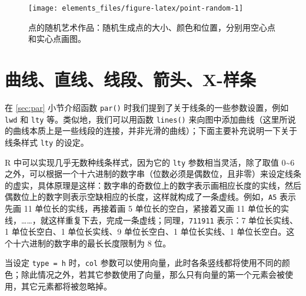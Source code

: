 \documentclass[
  b5paper,
  UTF8,twoside]{book}
\begin{document}
\begin{figure}

{\centering \texttt{[image: elements\_files/figure-latex/point-random-1]} 

}

\caption[点的随机艺术作品]{点的随机艺术作品：随机生成点的大小、颜色和位置，分别用空心点和实心点画图。}\label{fig:point-random}
\end{figure}





\hypertarget{sec:lines}{%
\section{曲线、直线、线段、箭头、X-样条}\label{sec:lines}}

在 \ref{sec:par} 小节介绍函数 \texttt{par()} 时我们提到了关于线条的一些参数设置，例如 \texttt{lwd} 和 \texttt{lty} 等。类似地，我们可以用函数 \texttt{lines()} 来向图中添加曲线（这里所说的曲线本质上是一些线段的连接，并非光滑的曲线）；下面主要补充说明一下关于线条样式 \texttt{lty} 的设定。

R 中可以实现几乎无数种线条样式，因为它的 \texttt{lty} 参数相当灵活，除了取值 0\textasciitilde6 之外，可以根据一个十六进制的数字串（位数必须是偶数位，且非零）来设定线条的虚实，具体原理是这样：数字串的奇数位上的数字表示画相应长度的实线，然后偶数位上的数字则表示空缺相应的长度，这样就构成了一条虚线。例如，\texttt{\textquotesingle{}A5\textquotesingle{}} 表示先画 11 单位长的实线，再接着画 5 单位长的空白，紧接着又画 11 单位长的实线，\ldots\ldots，就这样重复下去，完成一条虚线；同理，\texttt{\textquotesingle{}711911\textquotesingle{}} 表示：7 单位长实线、1 单位长空白、1 单位长实线、9 单位长空白、1 单位长实线、1 单位长空白。这个十六进制的数字串的最长长度限制为 8 位。

当设定 \texttt{type\ =\ \textquotesingle{}h\textquotesingle{}} 时，\texttt{col} 参数可以使用向量，此时各条竖线都将使用不同的颜色；除此情况之外，若其它参数使用了向量，那么只有向量的第一个元素会被使用，其它元素都将被忽略掉。
\end{document}
